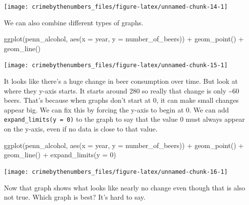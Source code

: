 \documentclass[
  12pt,
  openany]{book}
\newenvironment{Shaded}{\begin{snugshade}}{\end{snugshade}}
\newcommand{\AttributeTok}[1]{\textcolor[rgb]{0.61,0.61,0.61}{#1}}
\newcommand{\DecValTok}[1]{\textcolor[rgb]{0.06,0.06,0.06}{#1}}
\newcommand{\FunctionTok}[1]{\textcolor[rgb]{0,0,0}{#1}}
\newcommand{\NormalTok}[1]{#1}
\newcommand{\SpecialCharTok}[1]{\textcolor[rgb]{0,0,0}{#1}}
\begin{document}
\begin{center}\texttt{[image: crimebythenumbers\_files/figure-latex/unnamed-chunk-14-1]} \end{center}

We can also combine different types of graphs.

\begin{Shaded}
\begin{Highlighting}[]
\FunctionTok{ggplot}\NormalTok{(penn\_alcohol, }\FunctionTok{aes}\NormalTok{(}\AttributeTok{x =}\NormalTok{ year, }\AttributeTok{y =}\NormalTok{ number\_of\_beers)) }\SpecialCharTok{+}
  \FunctionTok{geom\_point}\NormalTok{() }\SpecialCharTok{+}
  \FunctionTok{geom\_line}\NormalTok{()}
\end{Highlighting}
\end{Shaded}

\begin{center}\texttt{[image: crimebythenumbers\_files/figure-latex/unnamed-chunk-15-1]} \end{center}

It looks like there's a huge change in beer consumption over time. But look at where they y-axis starts. It starts around 280 so really that change is only \textasciitilde60 beers. That's because when graphs don't start at 0, it can make small changes appear big. We can fix this by forcing the y-axis to begin at 0. We can add \texttt{expand\_limits(y\ =\ 0)} to the graph to say that the value 0 must always appear on the y-axis, even if no data is close to that value.

\begin{Shaded}
\begin{Highlighting}[]
\FunctionTok{ggplot}\NormalTok{(penn\_alcohol, }\FunctionTok{aes}\NormalTok{(}\AttributeTok{x =}\NormalTok{ year, }\AttributeTok{y =}\NormalTok{ number\_of\_beers)) }\SpecialCharTok{+}
  \FunctionTok{geom\_point}\NormalTok{() }\SpecialCharTok{+}
  \FunctionTok{geom\_line}\NormalTok{() }\SpecialCharTok{+}
  \FunctionTok{expand\_limits}\NormalTok{(}\AttributeTok{y =} \DecValTok{0}\NormalTok{)}
\end{Highlighting}
\end{Shaded}

\begin{center}\texttt{[image: crimebythenumbers\_files/figure-latex/unnamed-chunk-16-1]} \end{center}

Now that graph shows what looks like nearly no change even though that is also not true. Which graph is best? It's hard to say.
\end{document}
